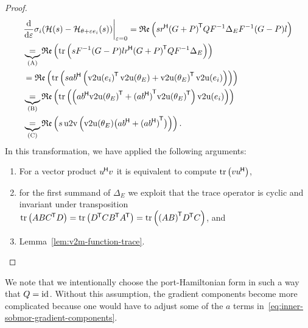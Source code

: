 \begin{proof}
\begin{equation}
\begin{aligned}
            &\res{\frac{\dif}{\dif \varepsilon} \sigma_i(\mcl{H}(s) - \mcl{H}_{\theta + \varepsilon e_i}(s))}{\varepsilon = 0} = \re{s r\herm {(G + P)}\trans Q F\inv \Delta_E F\inv (G - P) l} \\
             &\underbrace{=}_{(\msc{A})} \re{\trace{s F\inv (G - P) l r\herm {(G + P)}\trans Q F\inv \Delta_E}} \\
             &= \re{\trace{s a b\herm \left( {\vecupper(e_i)}\trans \vecupper(\theta_E) + {\vecupper(\theta_E)}\trans \vecupper(e_i) \right)}} \\
             &\underbrace{=}_{(\msc{B})} \re{\trace{\left( a b\herm {\vecupper(\theta_E)}\trans + {(a b\herm)}\trans {\vecupper(\theta_E)}\trans \right) \vecupper(e_i)}} \\
             &\underbrace{=}_{(\msc{C})} \re{s \uppervec\left( \vecupper(\theta_E) \bigl( a b\herm + {(a b\herm)}\trans \bigr) \right)}.
        \end{aligned}
    \end{equation}
    In this transformation, we have applied the following arguments:
    \begin{enumerate}[label= (\scshape{\alph*})]
        \item For a vector product $u^{\mkern-1.5mu \mathsf{H}} v$ it is equivalent to compute $\mathop{}\!\mathrm{tr}\left(v u^{\mkern-1.5mu \mathsf{H}}\right)$,
        \item for the first summand of $\Delta_E$ we exploit that the trace operator is cyclic and invariant under transposition $\mathop{}\!\mathrm{tr}\left(A B C^{\mkern-1.5mu \mathsf{T}} D\right) = \mathop{}\!\mathrm{tr}\left(D^{\mkern-1.5mu \mathsf{T}} C B^{\mkern-1.5mu \mathsf{T}} A^{\mkern-1.5mu \mathsf{T}}\right) = \mathop{}\!\mathrm{tr}\left({(A B)}^{\mkern-1.5mu \mathsf{T}} D^{\mkern-1.5mu \mathsf{T}} C\right)$, and
        \item Lemma~\ref{lem:v2m-function-trace}.
    \end{enumerate}

\end{proof}

\begin{remark}
    We note that we intentionally choose the port-Hamiltonian form in such a way that $Q = \text{id}_{}$.
    Without this assumption, the gradient components become more complicated because one would have to adjust some of the $a$ terms in~\eqref{eq:inner-sobmor-gradient-components}.
\end{remark}

